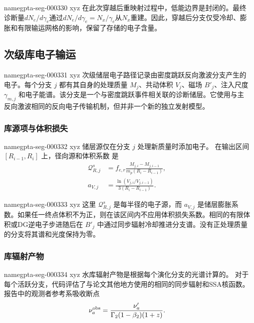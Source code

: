 \documentclass[twocolumn]{aastex702}
\makeatletter
\providecommand{\gptareaderanchor}[1]{\pdfdest name{#1} xyz}%
\providecommand{\gptareaderanchor}[1]{\special{pdf:dest (#1) [ @thispage /XYZ @xpos @ypos null ]}}%
\makeatother
\begin{document}
\gptareaderanchor{gpta-seg-000330}%
在此次穿越后重映射过程中，低能边界是封闭的。最终诊断量\(dN_e/d\gamma_e\)通过\(dN_e/d\gamma_e=N_x/\gamma_e\)从\(N_x\)重建。因此，穿越后分支仅受冷却、膨胀和有限输运网格的影响，保留了存储的电子含量。

\subsection{次级库电子输运}


\gptareaderanchor{gpta-seg-000331}%
次级储层电子路径记录由密度跳跃反向激波分支产生的电子。每个分支 \(j\) 都有其自身的处理质量 \(M_j\)、共动体积 \(V_j\)、磁场 \(B'_j\)、注入尺度 \(\gamma_{m,j}\) 和电子能谱。该分支是一个与密度跳跃事件相关联的诊断储层。它使用与主反向激波相同的反向电子传输机制，但并非一个新的独立发射模型。

\subsubsection{库源项与体积损失}


\gptareaderanchor{gpta-seg-000332}%
储层源仅在分支 \(j\) 处理新质量时添加电子。
在输出区间 \([R_{i-1},R_i]\) 上，径向源和体积系数
是
\begin{equation}
\begin{aligned}
\mathcal Q^{s}_{R,j}
&=f_{e,r}\frac{M_{j,i}-M_{j,i-1}}
{m_p(R_i-R_{i-1})},\\
a_{V,j}&=
\frac{\ln(V_{j,i}/V_{j,i-1})}
{3(R_i-R_{i-1})}.
\end{aligned}
\end{equation}

\gptareaderanchor{gpta-seg-000333}%
这里 \(\mathcal Q^{s}_{R,j}\) 是每半径的电子源，而 \(a_{V,j}\) 是储层膨胀系数。如果任一终点体积不为正，则在该区间内不应用体积损失系数。相同的有限体积或DG逆电子步进随后在 \(B'_j\) 中通过同步辐射冷却推进分支谱。没有正处理质量的分支将其谱和光度保持为零。

\subsubsection{库辐射产物}


\gptareaderanchor{gpta-seg-000334}%
水库辐射产物是根据每个演化分支的光谱计算的。
对于每个活跃分支，代码评估了与论文其他地方使用的相同的同步辐射和SSA核函数。
报告中的观测者参考系吸收断点
\begin{equation}
\nu_a^{\rm obs}=
\frac{\nu_a'}
{\Gamma_2(1-\beta_2)(1+z)} .
\end{equation}
\end{document}
